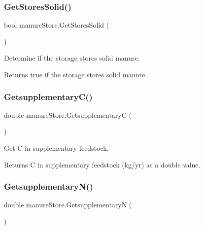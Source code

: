 \subsubsection{\texorpdfstring{GetStoresSolid()}{GetStoresSolid()}}
{\footnotesize\ttfamily bool manure\+Store.\+Get\+Stores\+Solid (\begin{DoxyParamCaption}{ }\end{DoxyParamCaption})\hspace{0.3cm}{\ttfamily [inline]}}



Determine if the storage stores solid manure. 

\begin{DoxyReturn}{Returns}
true if the storage stores solid manure. 
\end{DoxyReturn}
\mbox{\label{classmanure_store_add321ae5ffcd148e411d00494d9fe890}} 
\subsubsection{\texorpdfstring{GetsupplementaryC()}{GetsupplementaryC()}}
{\footnotesize\ttfamily double manure\+Store.\+GetsupplementaryC (\begin{DoxyParamCaption}{ }\end{DoxyParamCaption})\hspace{0.3cm}{\ttfamily [inline]}}



Get C in supplementary feedstock. 

\begin{DoxyReturn}{Returns}
C in supplementary feedstock (kg/yr) as a double value. 
\end{DoxyReturn}
\mbox{\label{classmanure_store_affdd4f35b4bd40bd5293e95c5ff482bf}} 
\subsubsection{\texorpdfstring{GetsupplementaryN()}{GetsupplementaryN()}}
{\footnotesize\ttfamily double manure\+Store.\+GetsupplementaryN (\begin{DoxyParamCaption}{ }\end{DoxyParamCaption})\hspace{0.3cm}{\ttfamily [inline]}}



